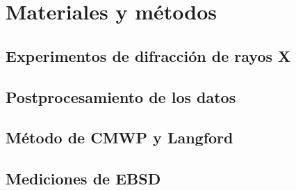 \chapter{Materiales y métodos}
\graphicspath{{./figs/02_Mat/}}
\section{Experimentos de difracción de rayos X}\label{S:MatXRD}
\section{Postprocesamiento de los datos}\label{S:MatPost}
\section{Método de CMWP y Langford}\label{S:MatCMWP}
\section{Mediciones de EBSD}\label{S:MatEBSD}
